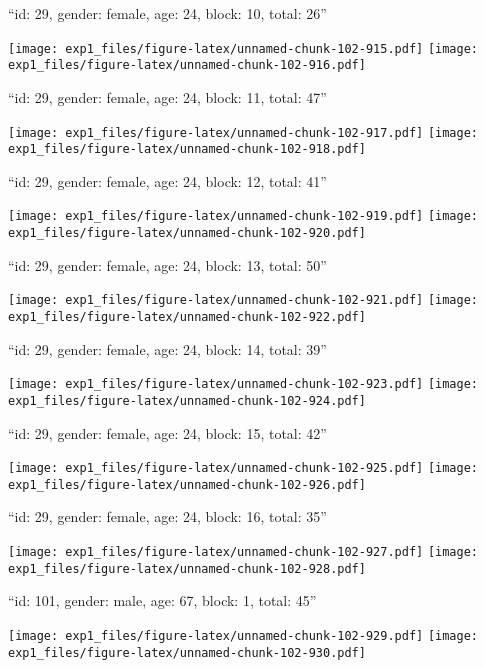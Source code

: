 \documentclass[11pt,,]{article}
\begin{document}
\newpage
[1] 

``id: 29, gender: female, age: 24, block: 10, total: 26''

\texttt{[image: exp1\_files/figure-latex/unnamed-chunk-102-915.pdf]}
\texttt{[image: exp1\_files/figure-latex/unnamed-chunk-102-916.pdf]}

\newpage
[1] 

``id: 29, gender: female, age: 24, block: 11, total: 47''

\texttt{[image: exp1\_files/figure-latex/unnamed-chunk-102-917.pdf]}
\texttt{[image: exp1\_files/figure-latex/unnamed-chunk-102-918.pdf]}

\newpage
[1] 

``id: 29, gender: female, age: 24, block: 12, total: 41''

\texttt{[image: exp1\_files/figure-latex/unnamed-chunk-102-919.pdf]}
\texttt{[image: exp1\_files/figure-latex/unnamed-chunk-102-920.pdf]}

\newpage
[1] 

``id: 29, gender: female, age: 24, block: 13, total: 50''

\texttt{[image: exp1\_files/figure-latex/unnamed-chunk-102-921.pdf]}
\texttt{[image: exp1\_files/figure-latex/unnamed-chunk-102-922.pdf]}

\newpage
[1] 

``id: 29, gender: female, age: 24, block: 14, total: 39''

\texttt{[image: exp1\_files/figure-latex/unnamed-chunk-102-923.pdf]}
\texttt{[image: exp1\_files/figure-latex/unnamed-chunk-102-924.pdf]}

\newpage
[1] 

``id: 29, gender: female, age: 24, block: 15, total: 42''

\texttt{[image: exp1\_files/figure-latex/unnamed-chunk-102-925.pdf]}
\texttt{[image: exp1\_files/figure-latex/unnamed-chunk-102-926.pdf]}

\newpage
[1] 

``id: 29, gender: female, age: 24, block: 16, total: 35''

\texttt{[image: exp1\_files/figure-latex/unnamed-chunk-102-927.pdf]}
\texttt{[image: exp1\_files/figure-latex/unnamed-chunk-102-928.pdf]}

\newpage
[1] 

``id: 101, gender: male, age: 67, block: 1, total: 45''

\texttt{[image: exp1\_files/figure-latex/unnamed-chunk-102-929.pdf]}
\texttt{[image: exp1\_files/figure-latex/unnamed-chunk-102-930.pdf]}
\end{document}
